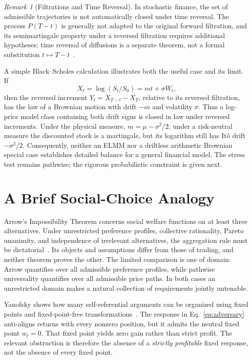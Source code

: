 \documentclass[aps,pra,reprint,superscriptaddress,amsmath,amssymb,floatfix]{revtex4-2}
\theoremstyle{plain}
\theoremstyle{definition}
\theoremstyle{remark}
\newtheorem{remark}{Remark}
\begin{document}
\begin{remark}[Filtrations and Time Reversal]
In stochastic finance, the set of admissible trajectories is not automatically
closed under time reversal. The process \(P(T-t)\) is generally not adapted to
the original forward filtration, and its semimartingale property under a
reversed filtration requires additional hypotheses; time reversal of
diffusions is a separate theorem, not a formal substitution
\(t\mapsto T-t\)~\cite{HaussmannPardoux1986}.

A simple Black--Scholes calculation illustrates both the useful case and its
limit. If
\[
  X_t=\log(S_t/S_0)=mt+\sigma W_t,
\]
then the reversed increment \(Y_t=X_{T-t}-X_T\), relative to its reversed
filtration, has the law of a Brownian motion with drift \(-m\) and volatility
\(\sigma\). Thus a log-price model class containing both drift signs is closed
in law under reversed increments. Under the physical measure,
\(m=\mu-\sigma^2/2\); under a risk-neutral measure the discounted stock is a
martingale, but its logarithm still has It\^o drift \(-\sigma^2/2\).
Consequently, neither an ELMM nor a driftless arithmetic Brownian special case
establishes detailed balance for a general financial model. The stress test
remains pathwise; the rigorous probabilistic constraint is given next.
\end{remark}

\section{A Brief Social-Choice Analogy}
\label{sec:arrow}

Arrow's Impossibility Theorem concerns social welfare functions on at least
three alternatives. Under unrestricted preference profiles, collective
rationality, Pareto unanimity, and independence of irrelevant alternatives,
the aggregation rule must be dictatorial~\cite{Arrow1963}. Its objects and
assumptions differ from those of trading, and neither theorem proves the
other. The limited comparison is one of domain: Arrow quantifies over all
admissible preference profiles, while pathwise universality quantifies over
all admissible price paths. In both cases an unrestricted domain makes a
natural collection of requirements jointly untenable.

Yanofsky shows how many self-referential arguments can be organized using
fixed points and fixed-point-free transformations~\cite{Yanofsky-BSL:9051621}.
The response in Eq.~\eqref{eq:adversary} anti-aligns returns with every
nonzero position, but it admits the neutral fixed point \(w_t=0\). That fixed
point yields zero gain rather than strict profit. The relevant obstruction is
therefore the absence of a \emph{strictly profitable} fixed response, not the
absence of every fixed point.
\end{document}
